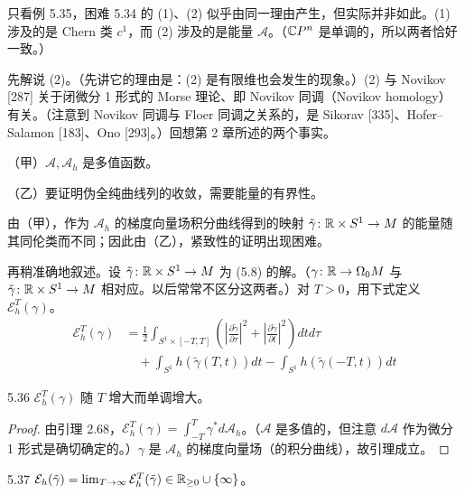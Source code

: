 只看例 5.35，困难 5.34 的 (1)、(2) 似乎由同一理由产生，但实际并非如此。(1) 涉及的是 Chern 类 $c^1$，而 (2) 涉及的是能量 $\mathcal{A}$。（$\mathbb{C}P^n$ 是单调的，所以两者恰好一致。）


先解说 (2)。（先讲它的理由是：(2) 是有限维也会发生的现象。）(2) 与 Novikov [287] 关于闭微分 1 形式的 Morse 理论、即 Novikov 同调（Novikov homology）有关。（注意到 Novikov 同调与 Floer 同调之关系的，是 Sikorav [335]、Hofer–Salamon [183]、Ono [293]。）回想第 2 章所述的两个事实。

（甲）$\mathcal{A},\mathcal{A}_h$ 是多值函数。

（乙）要证明伪全纯曲线列的收敛，需要能量的有界性。

由（甲），作为 $\mathcal{A}_h$ 的梯度向量场积分曲线得到的映射 $\tilde\gamma\colon\mathbb{R}\times S^1\to M$ 的能量随其同伦类而不同；因此由（乙），紧致性的证明出现困难。

再稍准确地叙述。设 $\tilde\gamma\colon\mathbb{R}\times S^1\to M$ 为 (5.8) 的解。（$\gamma\colon\mathbb{R}\to\Omega_0M$ 与 $\tilde\gamma\colon\mathbb{R}\times S^1\to M$ 相对应。以后常常不区分这两者。）对 $T>0$，用下式定义 $\mathcal{E}_h^T(\gamma)$。
\begin{align*}
  \mathcal{E}_h^T(\gamma)
  &=\frac12\int_{S^1\times[-T,T]}\left(\left|\frac{\partial\tilde\gamma}{\partial\tau}\right|^2
    +\left|\frac{\partial\tilde\gamma}{\partial t}\right|^2\right)dtd\tau\\
  &\quad+\int_{S^1}h(\tilde\gamma(T,t))dt-\int_{S^1}h(\tilde\gamma(-T,t))dt
\end{align*}

\begin{lemma*}{5.36}
  $\mathcal{E}_h^T(\gamma)$ 随 $T$ 增大而单调增大。
\end{lemma*}

\begin{proof}
  由引理 2.68，$\mathcal{E}_h^T(\gamma)=\int_{-T}^T\gamma^*d\mathcal{A}_h$。（$\mathcal{A}$ 是多值的，但注意 $d\mathcal{A}$ 作为微分 1 形式是确切确定的。）$\gamma$ 是 $\mathcal{A}_h$ 的梯度向量场（的积分曲线），故引理成立。
\end{proof}

\begin{definition}{5.37}
  $\mathcal{E}_h(\tilde\gamma)=\lim_{T\to\infty}\mathcal{E}_h^T(\tilde\gamma)\in\mathbb{R}_{\ge0}\cup\{\infty\}$。
\end{definition}

